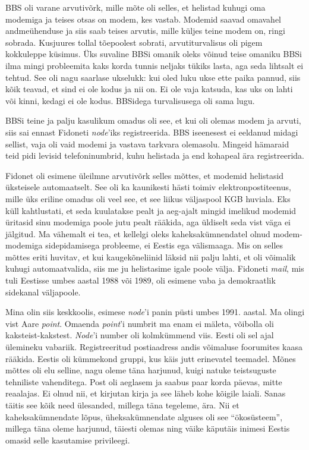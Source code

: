 BBS oli varane arvutivõrk, mille mõte oli selles, et helistad 
kuhugi oma modemiga ja teises otsas on modem, kes vastab. Modemid saavad 
omavahel andmeühenduse ja siis saab teises arvutis, mille 
küljes teine modem on, ringi sobrada. Kusjuures tollal tõepoolest
sobrati, arvutiturvalisus oli pigem kokkuleppe 
küsimus. Üks suvaline BBSi omanik oleks võinud teise 
omaniku BBSi ilma mingi 
probleemita kaks korda tunnis neljaks tükiks lasta, aga seda lihtsalt ei 
tehtud. See oli nagu 
saarlase ukselukk: kui oled luku ukse ette paika pannud, siis kõik 
teavad, et sind ei ole kodus ja nii on. Ei ole vaja katsuda, kas uks 
on lahti või kinni, kedagi ei ole kodus. BBSidega turvalisusega oli sama lugu. 

BBSi teine ja palju kasulikum omadus oli see, et kui 
oli olemas modem ja arvuti, siis sai ennast Fidoneti 
\emph{node}'iks registreerida. BBS iseenesest ei eeldanud midagi sellist, vaja 
oli vaid
modemi ja vastava tarkvara olemasolu. Mingeid hämaraid teid pidi levisid 
telefoninumbrid, kuhu helistada ja end kohapeal ära registreerida.

Fidonet oli esimene üleilmne arvutivõrk selles 
mõttes, et modemid helistasid üksteisele automaatselt. See oli ka kaunikesti 
hästi toimiv elektronpostiteenus, mille üks eriline omadus 
oli veel see, et see liikus väljaspool KGB huviala. Eks küll 
kahtlustati, et seda kuulatakse pealt ja aeg-ajalt mingid imelikud modemid 
üritasid sinu modemiga poole jutu pealt rääkida, aga üldiselt seda vist väga ei 
jälgitud. Ma vähemalt ei tea, et kellelgi oleks 
kaheksakümnendatel olnud modem-modemiga sidepidamisega probleeme, ei Eestis ega 
välismaaga. Mis on selles mõttes eriti huvitav, et kui kaugekõneliinid läksid 
nii palju lahti, et oli võimalik kuhugi automaatvalida, siis me ju helistasime 
igale poole välja.  
Fidoneti \emph{mail}, mis tuli Eestisse umbes aastal 1988 või 1989, oli esimene 
vaba ja 
demokraatlik sidekanal väljapoole.

Mina olin siis keskkoolis, esimese \emph{node}'i panin püsti umbes 1991. 
aastal. Ma olingi vist Aare \emph{point}. 
Omaenda \emph{point}'i numbrit ma enam ei mäleta, võibolla oli 
kaksteist-kakstest. \emph{Node}'i number oli
kolmkümmend viis. Eesti oli sel ajal ülemineku vabariik. 
Registreeritud postiaadress andis võimaluse foorumites 
kaasa rääkida. Eestis oli kümmekond gruppi, kus käis jutt erinevatel 
teemadel. Mõnes mõttes oli elu selline, nagu oleme täna 
harjunud, kuigi natuke teistsuguste tehniliste vahenditega. Post oli aeglasem 
ja 
saabus paar korda 
päevas, mitte reaalajas. Ei olnud nii, et kirjutan kirja ja see läheb kohe 
kõigile laiali. Sanas täitis see kõik need ülesanded, millega täna tegeleme, 
ära. Nii et kaheksakümnendate lõpus, üheksakümnendate alguses oli see 
\enquote{ökosüsteem}, millega täna oleme harjunud, täiesti olemas ning 
väike käputäis inimesi Eestis omasid selle kasutamise privileegi. 


